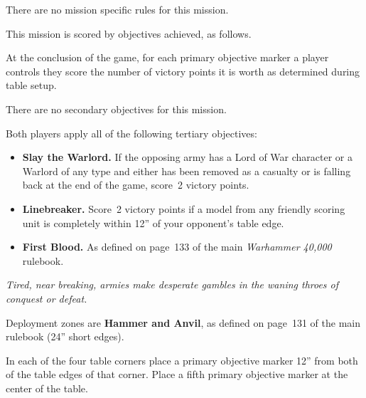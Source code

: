 \documentclass{40k}
\begin{document}

There are no mission specific rules for this mission.



This mission is scored by objectives achieved, as follows.

 At the conclusion of the game,
for each primary objective marker a player controls they score the
number of victory points it is worth as determined during table setup.


There are no secondary objectives for this mission.

  Both players apply all of
the following tertiary objectives:

\begin{itemize}
\item \textbf{Slay the Warlord.}  If the opposing army has a Lord of
  War character or a Warlord of any type and either has been removed
  as a casualty or is falling back at the end of the game, score~2
  victory points.

\item \textbf{Linebreaker.}  Score~2 victory points if a model from
  any friendly scoring unit is completely within 12'' of your
  opponent's table edge.

\item \textbf{First Blood.}  As defined on page~133 of the main
  \emph{Warhammer 40,000} rulebook.
\end{itemize}



\centerline{\emph{Tired, near breaking, armies make desperate gambles
    in the waning throes of conquest or defeat.}}


Deployment zones are \textbf{Hammer and Anvil}, as defined on page~131
of the main rulebook (24'' short edges).

\bigskip%
In each of the four table corners place a primary objective marker
12'' from both of the table edges of that corner.  Place a fifth
primary objective marker at the center of the table.

\end{document}
